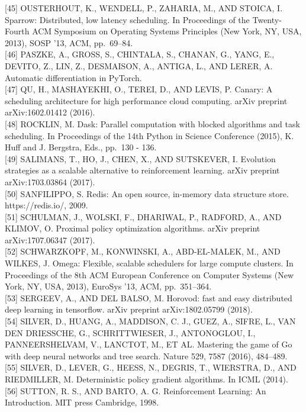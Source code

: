 \documentclass[
]{article}
\begin{document}
{[}45{]} OUSTERHOUT, K., WENDELL, P., ZAHARIA, M., AND STOICA, I.
Sparrow: Distributed, low latency scheduling. In Proceedings of the
Twenty-Fourth ACM Symposium on Operating Systems Principles (New York,
NY, USA, 2013), SOSP '13, ACM, pp.~69--84.\\
{[}46{]} PASZKE, A., GROSS, S., CHINTALA, S., CHANAN, G., YANG, E.,
DEVITO, Z., LIN, Z., DESMAISON, A., ANTIGA, L., AND LERER, A. Automatic
differentiation in PyTorch.\\
{[}47{]} QU, H., MASHAYEKHI, O., TEREI, D., AND LEVIS, P. Canary: A
scheduling architecture for high performance cloud computing. arXiv
preprint arXiv:1602.01412 (2016).\\
{[}48{]} ROCKLIN, M. Dask: Parallel computation with blocked algorithms
and task scheduling. In Proceedings of the 14th Python in Science
Conference (2015), K. Huff and J. Bergstra, Eds., pp.~130 - 136.\\
{[}49{]} SALIMANS, T., HO, J., CHEN, X., AND SUTSKEVER, I. Evolution
strategies as a scalable alternative to reinforcement learning. arXiv
preprint arXiv:1703.03864 (2017).\\
{[}50{]} SANFILIPPO, S. Redis: An open source, in-memory data structure
store. https://redis.io/, 2009.\\
{[}51{]} SCHULMAN, J., WOLSKI, F., DHARIWAL, P., RADFORD, A., AND
KLIMOV, O. Proximal policy optimization algorithms. arXiv preprint
arXiv:1707.06347 (2017).\\
{[}52{]} SCHWARZKOPF, M., KONWINSKI, A., ABD-EL-MALEK, M., AND WILKES,
J. Omega: Flexible, scalable schedulers for large compute clusters. In
Proceedings of the 8th ACM European Conference on Computer Systems (New
York, NY, USA, 2013), EuroSys '13, ACM, pp.~351--364.\\
{[}53{]} SERGEEV, A., AND DEL BALSO, M. Horovod: fast and easy
distributed deep learning in tensorflow. arXiv preprint arXiv:1802.05799
(2018).\\
{[}54{]} SILVER, D., HUANG, A., MADDISON, C. J., GUEZ, A., SIFRE, L.,
VAN DEN DRIESSCHE, G., SCHRITTWIESER, J., ANTONOGLOU, I.,
PANNEERSHELVAM, V., LANCTOT, M., ET AL. Mastering the game of Go with
deep neural networks and tree search. Nature 529, 7587 (2016),
484--489.\\
{[}55{]} SILVER, D., LEVER, G., HEESS, N., DEGRIS, T., WIERSTRA, D., AND
RIEDMILLER, M. Deterministic policy gradient algorithms. In ICML
(2014).\\
{[}56{]} SUTTON, R. S., AND BARTO, A. G. Reinforcement Learning: An
Introduction. MIT press Cambridge, 1998.\\
\end{document}
